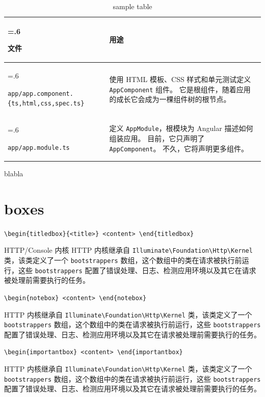 \documentclass{../utils/progartcn}
\begin{document}
\noindent
\begin{table}[h!]
  \caption{sample table}\label{table:1}
  \begin{tabularx}{\textwidth}{>{\hsize=.6\hsize\raggedright\arraybackslash}X>{\raggedright\arraybackslash}X}\toprule
    \bfseries{文件} & \bfseries{用途}\\ \midrule
    \verb|app/app.component.{ts,html,css,spec.ts}| & 使用 HTML 模板、CSS 样式和单元测试定义 \verb|AppComponent| 组件。 它是根组件，随着应用的成长它会成为一棵组件树的根节点。\\
    \verb|app/app.module.ts| & 定义 \verb|AppModule|，根模块为 Angular 描述如何组装应用。 目前，它只声明了 \verb|AppComponent|。 不久，它将声明更多组件。\\ \bottomrule
  \end{tabularx}
\end{table}
blabla

\clearpage

\section{boxes}

\noindent\verb|\begin{titledbox}{<title>} <content> \end{titledbox}|

\begin{titledbox}{HTTP/Console 内核}
  HTTP 内核继承自 \verb|Illuminate\Foundation\Http\Kernel| 类，该类定义了一个 \verb|bootstrappers| 数组，这个数组中的类在请求被执行前运行，这些 \verb|bootstrappers| 配置了错误处理、日志、检测应用环境以及其它在请求被处理前需要执行的任务。
\end{titledbox}

\noindent\verb|\begin{notebox} <content> \end{notebox}|

\begin{notebox}
  HTTP 内核继承自 \verb|Illuminate\Foundation\Http\Kernel| 类，该类定义了一个 \verb|bootstrappers| 数组，这个数组中的类在请求被执行前运行，这些 \verb|bootstrappers| 配置了错误处理、日志、检测应用环境以及其它在请求被处理前需要执行的任务。
\end{notebox}

\noindent\verb|\begin{importantbox} <content> \end{importantbox}|

\begin{importantbox}
  HTTP 内核继承自 \verb|Illuminate\Foundation\Http\Kernel| 类，该类定义了一个 \verb|bootstrappers| 数组，这个数组中的类在请求被执行前运行，这些 \verb|bootstrappers| 配置了错误处理、日志、检测应用环境以及其它在请求被处理前需要执行的任务。
\end{importantbox}
\end{document}
